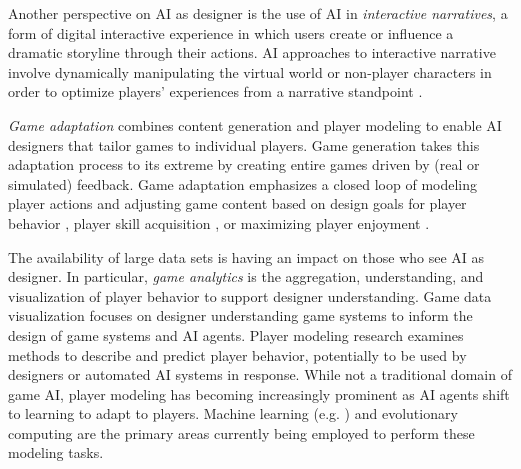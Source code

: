 \documentclass[conference]{IEEEtran}
\begin{document}
Another perspective on AI as designer is the use of AI in {\em interactive narratives}, a form of digital interactive experience in which users create or influence a dramatic storyline through their actions. AI approaches to interactive narrative involve dynamically manipulating the virtual world or  non-player characters in order to optimize players' experiences from a narrative standpoint \cite{mateas1999:oz-review-dm, roberts2008:dm-review, riedl2013:in-aimag}.

{\em Game adaptation} combines content generation and player modeling to enable AI designers that tailor games to individual players. Game generation takes this adaptation process to its extreme by creating entire games driven by (real or simulated) feedback. Game adaptation emphasizes a closed loop of modeling player actions and adjusting game content based on design goals for player behavior \cite{smith2012:refraction}, player skill acquisition \cite{andersen2013:trace}, or maximizing player enjoyment \cite{yu2011:minboredom, shaker2010:platformer-gen}.



The availability of large data sets is having an impact on those who see AI as designer.
In particular, {\em game analytics} \cite{seifel-nasr2013:game-analytics-book} is the aggregation, understanding, and visualization of player behavior to support designer understanding. 
Game data visualization \cite{wallner2013:gameplay-viz-analysis} focuses on designer understanding game systems to inform the design of game systems and AI agents. Player modeling research \cite{smith2011:playermodel} examines methods to describe and predict player behavior, potentially to be used by designers or automated AI systems in response. While not a traditional domain of game AI, player modeling has becoming increasingly prominent as AI agents shift to learning to adapt to players. Machine learning (e.g. \cite{harrison2011:wow-seq-pred, weber2011:playermodel}) and evolutionary computing \cite{yannakakis2011:edpcg} are the primary areas currently being employed to perform these modeling tasks.
\end{document}
